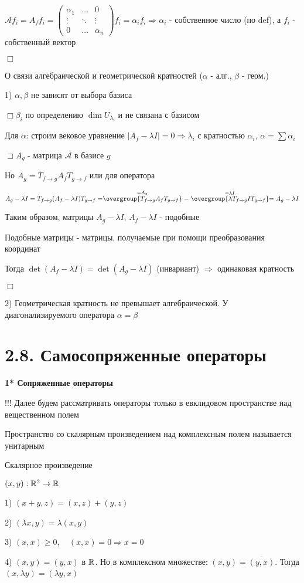 \documentclass[12pt]{article}
\begin{document}
    $\mathcal{A}f_i = A_f f_i = \begin{pmatrix}
                                    \alpha_1 & \dots  & 0        \\
                                    \vdots   & \ddots & \vdots   \\
                                    0        & \dots  & \alpha_n
    \end{pmatrix} f_i = \alpha_i f_i \Longrightarrow \alpha_i$ - собственное число (по def), а $f_i$ - собственный вектор

    $\Box$

    \Nota О связи алгебраической и геометрической кратностей ($\alpha$ - алг., $\beta$ - геом.)

    1) $\alpha, \beta$ не зависят от выбора базиса

    $\Box \beta_i$ по определению $\dim U_{\lambda_i}$ и не связана с базисом

    Для $\alpha$: строим вековое уравнение $|A_f - \lambda I| = 0 \Longrightarrow \lambda_i$ с кратностью $\alpha_i$, $\alpha = \sum \alpha_i$

    $\sqsupset A_g$ - матрица $\mathcal{A}$ в базисе $g$

    Но $A_g = T_{f\to g} A_f T_{g\to f}$ или для оператора

    $A_g - \lambda I = T_{f\to g} (A_f - \lambda I) T_{g\to f} =
    \stackrel{= A_g}{\overgroup{T_{f\to g} A_f T_{g\to f}}} - \stackrel{= \lambda I}{\overgroup{\lambda T_{f\to g} I T_{g\to f}}} =
    A_g - \lambda I$

    Таким образом, матрицы $A_g - \lambda I$, $A_f - \lambda I$ - подобные

    \Def Подобные матрицы - матрицы, получаемые при помощи преобразования координат

    Тогда $\det (A_f - \lambda I) = \det (A_g - \lambda I)$ (инвариант) $\Longrightarrow$ одинаковая кратность

    $\Box$

    2) Геометрическая кратность не превышает алгебраической. У диагонализируемого оператора $\alpha = \beta$

    \section[p2\_8]{2.8. Самосопряженные операторы}

    \textbf{1* Сопряженные операторы}

    !!! Далее будем рассматривать операторы только в евклидовом пространстве над вещественном полем

    Пространство со скалярным произведением над комплексным полем называется унитарным

    \Mem Скалярное произведение

    $(x, y) : \mathbb{R}^2 \rightarrow \mathbb{R}$

    1) $(x + y, z) = (x, z) + (y, z)$

    2) $(\lambda x, y) = \lambda (x, y)$

    3) $(x, x) \geq 0, \quad (x, x) = 0 \Longrightarrow x = 0$

    4) $(x, y) = (y, x)$ в $\mathbb{R}$. Но в комплексном множестве: $(x, y) = \overline{(y, x)}$. Тогда $(x, \lambda y) = \overline{(\lambda y, x)}$
\end{document}
